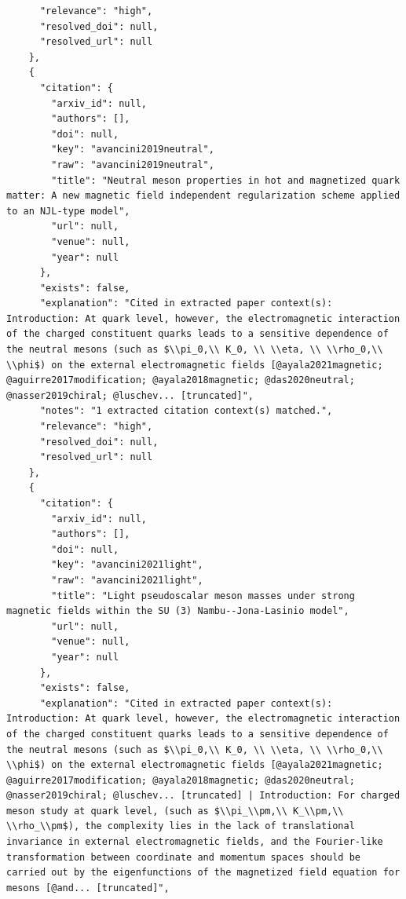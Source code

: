\documentclass[11pt]{article}
\begin{document}
\begin{verbatim}
      "relevance": "high",
      "resolved_doi": null,
      "resolved_url": null
    },
    {
      "citation": {
        "arxiv_id": null,
        "authors": [],
        "doi": null,
        "key": "avancini2019neutral",
        "raw": "avancini2019neutral",
        "title": "Neutral meson properties in hot and magnetized quark matter: A new magnetic field independent regularization scheme applied to an NJL-type model",
        "url": null,
        "venue": null,
        "year": null
      },
      "exists": false,
      "explanation": "Cited in extracted paper context(s): Introduction: At quark level, however, the electromagnetic interaction of the charged constituent quarks leads to a sensitive dependence of the neutral mesons (such as $\\pi_0,\\ K_0, \\ \\eta, \\ \\rho_0,\\ \\phi$) on the external electromagnetic fields [@ayala2021magnetic; @aguirre2017modification; @ayala2018magnetic; @das2020neutral; @nasser2019chiral; @luschev... [truncated]",
      "notes": "1 extracted citation context(s) matched.",
      "relevance": "high",
      "resolved_doi": null,
      "resolved_url": null
    },
    {
      "citation": {
        "arxiv_id": null,
        "authors": [],
        "doi": null,
        "key": "avancini2021light",
        "raw": "avancini2021light",
        "title": "Light pseudoscalar meson masses under strong magnetic fields within the SU (3) Nambu--Jona-Lasinio model",
        "url": null,
        "venue": null,
        "year": null
      },
      "exists": false,
      "explanation": "Cited in extracted paper context(s): Introduction: At quark level, however, the electromagnetic interaction of the charged constituent quarks leads to a sensitive dependence of the neutral mesons (such as $\\pi_0,\\ K_0, \\ \\eta, \\ \\rho_0,\\ \\phi$) on the external electromagnetic fields [@ayala2021magnetic; @aguirre2017modification; @ayala2018magnetic; @das2020neutral; @nasser2019chiral; @luschev... [truncated] | Introduction: For charged meson study at quark level, (such as $\\pi_\\pm,\\ K_\\pm,\\ \\rho_\\pm$), the complexity lies in the lack of translational invariance in external electromagnetic fields, and the Fourier-like transformation between coordinate and momentum spaces should be carried out by the eigenfunctions of the magnetized field equation for mesons [@and... [truncated]",

\end{verbatim}
\end{document}

